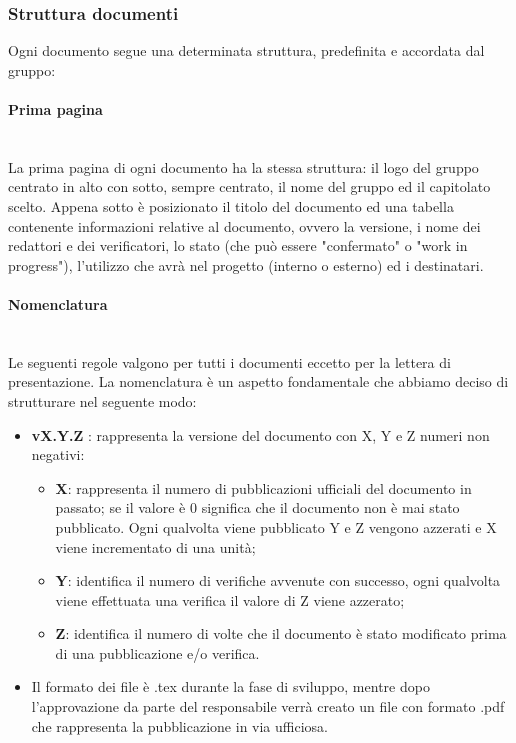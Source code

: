 \subsubsection{Struttura documenti}\label{ProcessiSupporto_Documentazione_StrutturaDocumenti}
Ogni documento segue una determinata struttura, predefinita e accordata dal gruppo:

\paragraph{Prima pagina} \-\\
La prima pagina di ogni documento ha la stessa struttura: il logo del gruppo centrato in alto con sotto, sempre centrato, il nome del gruppo ed il capitolato scelto. Appena sotto è posizionato il titolo del documento ed una tabella contenente informazioni relative al documento, ovvero la versione, i nome dei redattori e dei verificatori, lo stato (che può essere "confermato" o "work in progress"), l'utilizzo che avrà nel progetto (interno o esterno) ed i destinatari.

\paragraph{Nomenclatura} \-\\
Le seguenti regole valgono per tutti i documenti eccetto per la lettera di presentazione. La nomenclatura è un aspetto fondamentale che abbiamo deciso di strutturare nel seguente modo: 
\begin{itemize}
	\item \textbf{vX.Y.Z }: rappresenta la versione del documento con X, Y e Z numeri non negativi:
	\begin{itemize}
		\item \textbf{X}: rappresenta il numero di pubblicazioni ufficiali del documento in passato; se il valore è 0 significa che il documento non è mai stato pubblicato. Ogni qualvolta viene pubblicato Y e Z vengono azzerati e X viene incrementato di una unità;
		\item \textbf{Y}: identifica il numero di verifiche avvenute con successo, ogni qualvolta viene effettuata una verifica il valore di Z viene azzerato;
		\item \textbf{Z}: identifica il numero di volte che il documento è stato modificato prima di una pubblicazione e/o verifica.
	\end{itemize}
	\item Il formato dei file è .tex durante la fase di sviluppo, mentre dopo l'approvazione da parte del responsabile verrà creato un file con formato .pdf che rappresenta la pubblicazione in via ufficiosa.
\end{itemize}

